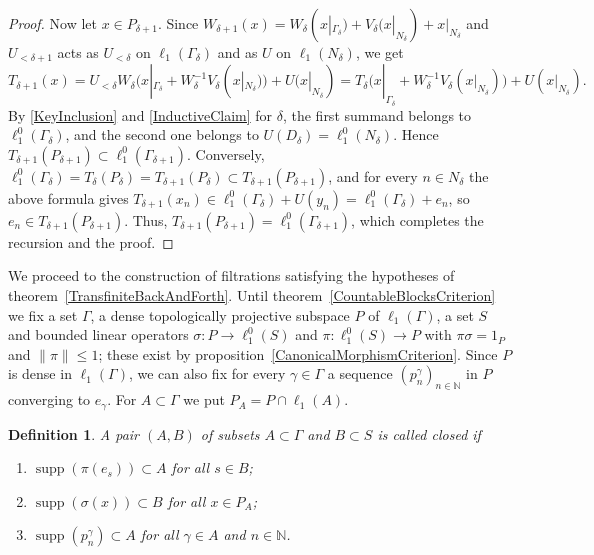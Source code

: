 \documentclass[12pt]{article}
\newtheorem{definition}[theorem]{Definition}
\newcommand{\lo}[1]{\ell_1^0(#1)}
\newcommand{\ellone}[1]{\ell_1(#1)}
\newcommand{\norm}[1]{\lVert #1\rVert}
\newcommand{\supp}{\operatorname{supp}}
\begin{document}
\begin{proof}
    Now let $x\in P_{\delta+1}$. Since $W_{\delta+1}(x)=W_\delta(x|_{\Gamma_\delta})
    +V_\delta(x|_{N_\delta})+x|_{N_\delta}$ and $U_{<\delta+1}$ acts as
    $U_{<\delta}$ on $\ellone{\Gamma_\delta}$ and as $U$ on
    $\ellone{N_\delta}$, we get
    \[
    T_{\delta+1}(x)=U_{<\delta}W_\delta\bigl(x|_{\Gamma_\delta}+W_\delta^{-1}V_\delta(x|_{N_\delta})\bigr)
    +U(x|_{N_\delta})
    =T_\delta\bigl(x|_{\Gamma_\delta}+W_\delta^{-1}V_\delta(x|_{N_\delta})\bigr)
    +U(x|_{N_\delta}).
    \]
    By \eqref{KeyInclusion} and \eqref{InductiveClaim} for $\delta$, the
    first summand belongs to $\lo{\Gamma_\delta}$, and the second one belongs
    to $U(D_\delta)=\lo{N_\delta}$. Hence $T_{\delta+1}(P_{\delta+1})\subset\lo{\Gamma_{\delta+1}}$.
    Conversely, $\lo{\Gamma_\delta}=T_\delta(P_\delta)=T_{\delta+1}(P_\delta)
    \subset T_{\delta+1}(P_{\delta+1})$, and for every $n\in N_\delta$ the
    above formula gives $T_{\delta+1}(x_n)\in\lo{\Gamma_\delta}+U(y_n)
    =\lo{\Gamma_\delta}+e_n$, so $e_n\in T_{\delta+1}(P_{\delta+1})$. Thus,
    $T_{\delta+1}(P_{\delta+1})=\lo{\Gamma_{\delta+1}}$, which completes the
    recursion and the proof.
\end{proof}

We proceed to the construction of filtrations satisfying the hypotheses of
theorem~\ref{TransfiniteBackAndForth}. Until theorem~\ref{CountableBlocksCriterion} we fix a
set $\Gamma$, a dense topologically
projective subspace $P$ of $\ellone{\Gamma}$, a set $S$ and bounded linear
operators $\sigma:P\to\lo{S}$ and $\pi:\lo{S}\to P$ with $\pi\sigma=1_P$ and
$\norm{\pi}\leq 1$; these exist by proposition~\ref{CanonicalMorphismCriterion}.
Since $P$ is dense in $\ellone{\Gamma}$, we can also fix for every
$\gamma\in\Gamma$ a sequence ${(p^\gamma_n)}_{n\in\mathbb{N}}$ in $P$ converging
to $e_\gamma$. For $A\subset\Gamma$ we put $P_A=P\cap\ellone{A}$.

\begin{definition}\label{ClosedPair} A pair $(A,B)$ of subsets $A\subset\Gamma$
    and $B\subset S$ is called closed if
    \begin{enumerate}[label = (\alph*)]
        \item $\supp(\pi(e_s))\subset A$ for all $s\in B$;
        \item $\supp(\sigma(x))\subset B$ for all $x\in P_A$;
        \item $\supp(p^\gamma_n)\subset A$ for all $\gamma\in A$ and
              $n\in\mathbb{N}$.
    \end{enumerate}
\end{definition}
\end{document}
